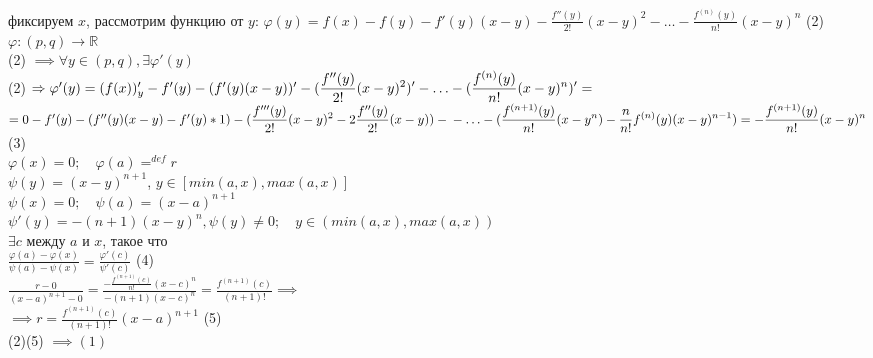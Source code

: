 \begin{replacementproof}
	фиксируем $x$, рассмотрим функцию от $y$:
	$\varphi(y)=f(x)-f(y)-f'(y)(x-y)-\displaystyle\frac{f''(y)}{2!}(x-y)^2-\ldots-\displaystyle\frac{f^{(n)}(y)}{n!}(x-y)^{n}$ (2)\\
	$\varphi: (p,q) \to \mathbb{R}$\\
	(2) $\implies \forall y \in (p,q), \exists \varphi'(y)$ \\
	(2) $\implies \varphi '(y)=(f(x))'_{y}-f'(y)-(f'(y)(x-y))'-(\displaystyle\frac{f''(y)}{2!}(x-y)^2)'-\ldots-(\displaystyle\frac{f^{(n)}(y)}{n!}(x-y)^{n})'=\\$ 
	$= 0-f'(y)-(f''(y)(x-y)-f'(y)*1)-(\displaystyle\frac{f'''(y)}{2!}(x-y)^2-2\displaystyle\frac{f''(y)}{2!}(x-y))-\\
	-\ldots-(\displaystyle\frac{f^{(n+1)}(y)}{n!}(x-y^{n})-\displaystyle\frac{n}{n!}f^{(n)}(y)(x-y)^{n-1})=-\displaystyle\frac{f^{(n+1)}(y)}{n!}(x-y)^{n}$ (3)\\
	$\varphi(x)=0; \quad \varphi(a)=^{def}r$ \\
	$\psi(y)=(x-y)^{n+1}$, $y \in [min(a,x), max(a,x)]$ \\
	$\psi(x)=0; \quad \psi(a)=(x-a)^{n+1}$ \\
	$\psi '(y)=-(n+1)(x-y)^{n}, \psi(y)\neq 0; \quad y \in (min(a,x), max(a,x))$\\
	$\exists c$ между $a$ и  $x$, такое что\\
	$\displaystyle\frac{\varphi(a)-\varphi(x)}{\psi(a)-\psi(x)}=\displaystyle\frac{\varphi '(c)}{\psi ' (c)}$ (4)\\
	$\displaystyle\frac{r-0}{(x-a)^{n+1}-0}=\displaystyle\frac{-\displaystyle\frac{f^{(n+1)}(c)}{n!}(x-c)^{n}}{-(n+1)(x-c)^{n}}=\displaystyle\frac{f^{(n+1)}(c)}{(n+1)!} \implies$\\
	$\implies r = \displaystyle\frac{f^{(n+1)}(c)}{(n+1)!}(x-a)^{n+1}$ (5)\\
	(2)(5) $\implies (1)$
\end{replacementproof}


